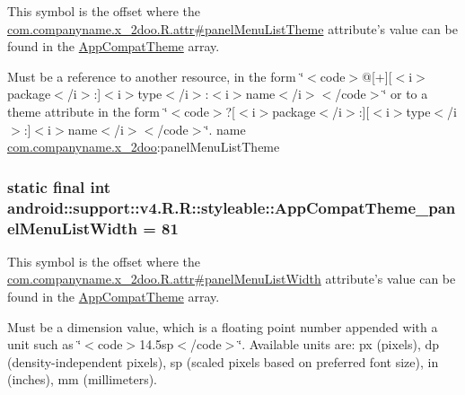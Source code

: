 This symbol is the offset where the \hyperlink{classcom_1_1companyname_1_1x__2doo_1_1_r_1_1attr_51dd84795ab7720d1db3f8f9d0276006}{com.companyname.x\_\-2doo.R.attr\#panelMenuListTheme} attribute's value can be found in the \hyperlink{classandroid_1_1support_1_1v4_1_1_r_1_1styleable_0873e92ba21076bb5a4aeadeb7f5779f}{AppCompatTheme} array.

Must be a reference to another resource, in the form \char`\"{}$<$code$>$@\mbox{[}+\mbox{]}\mbox{[}$<$i$>$package$<$/i$>$:\mbox{]}$<$i$>$type$<$/i$>$:$<$i$>$name$<$/i$>$$<$/code$>$\char`\"{} or to a theme attribute in the form \char`\"{}$<$code$>$?\mbox{[}$<$i$>$package$<$/i$>$:\mbox{]}\mbox{[}$<$i$>$type$<$/i$>$:\mbox{]}$<$i$>$name$<$/i$>$$<$/code$>$\char`\"{}.  name \hyperlink{namespacecom_1_1companyname_1_1x__2doo}{com.companyname.x\_\-2doo}:panelMenuListTheme \hypertarget{classandroid_1_1support_1_1v4_1_1_r_1_1styleable_5eae8eccd5625c8acb9a2d0522e7fd35}{
\subsubsection[{AppCompatTheme\_\-panelMenuListWidth}]{\setlength{\rightskip}{0pt plus 5cm}static final int android::support::v4.R.R::styleable::AppCompatTheme\_\-panelMenuListWidth = 81}}
\label{classandroid_1_1support_1_1v4_1_1_r_1_1styleable_5eae8eccd5625c8acb9a2d0522e7fd35}


This symbol is the offset where the \hyperlink{classcom_1_1companyname_1_1x__2doo_1_1_r_1_1attr_ac2dbbab7d655ba1d20a169766cb75fe}{com.companyname.x\_\-2doo.R.attr\#panelMenuListWidth} attribute's value can be found in the \hyperlink{classandroid_1_1support_1_1v4_1_1_r_1_1styleable_0873e92ba21076bb5a4aeadeb7f5779f}{AppCompatTheme} array.

Must be a dimension value, which is a floating point number appended with a unit such as \char`\"{}$<$code$>$14.5sp$<$/code$>$\char`\"{}. Available units are: px (pixels), dp (density-independent pixels), sp (scaled pixels based on preferred font size), in (inches), mm (millimeters). 

